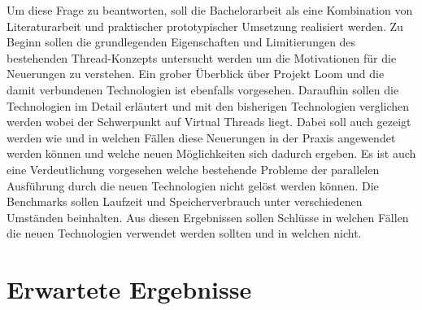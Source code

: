 



Um diese Frage zu beantworten, soll die Bachelorarbeit als eine
Kombination von Literaturarbeit und praktischer \bzw prototypischer Umsetzung
realisiert werden.
Zu Beginn sollen die grundlegenden Eigenschaften und Limitierungen des bestehenden 
Thread-Konzepts untersucht werden um die Motivationen für die Neuerungen zu verstehen. 
Ein grober Überblick über Projekt Loom und die damit verbundenen Technologien ist ebenfalls vorgesehen.
Daraufhin sollen die Technologien im Detail erläutert und mit den bisherigen Technologien 
verglichen werden wobei der Schwerpunkt auf Virtual Threads liegt.
Dabei soll auch gezeigt werden wie und in welchen Fällen diese Neuerungen in der Praxis 
angewendet werden können und welche neuen Möglichkeiten sich dadurch ergeben.
Es ist auch eine Verdeutlichung vorgesehen welche bestehende Probleme der parallelen Ausführung 
durch die neuen Technologien nicht gelöst werden können.
Die Benchmarks sollen Laufzeit und Speicherverbrauch unter verschiedenen Umständen beinhalten.
Aus diesen Ergebnissen sollen Schlüsse in welchen Fällen die neuen Technologien 
verwendet werden sollten und in welchen nicht.






\section{Erwartete Ergebnisse}

